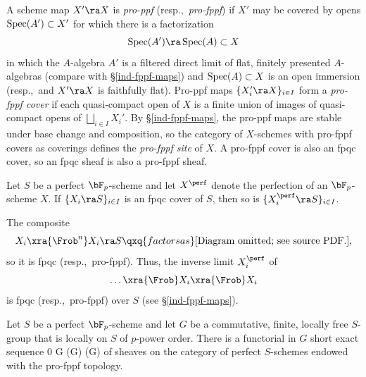 

 \label{X-profppf}
A scheme map $X' \ra X$ is \emph{pro-ppf} (resp.,~\emph{pro-fppf}) if $X'$ may be covered by opens $\operatorname{Spec}(A') \subset X'$ for which there is a factorization
\[
\Spec(A') \ra \Spec(A) \subset X
\]
in which the $A$-algebra $A'$ is a filtered direct limit of flat, finitely presented $A$-algebras (compare with \S\ref{ind-fppf-maps}) and $\operatorname{Spec}(A) \subset X$ is an open immersion (resp.,~and $X' \ra X$ is faithfully flat). Pro-ppf maps
$\{X_i' \ra X\}_{i \in I}$
form a \emph{pro-fppf cover} if each quasi-compact open of $X$ is a finite union of images of quasi-compact opens of $\bigsqcup_{i \in I} X_i'$.  By \S\ref{ind-fppf-maps}, the pro-ppf maps are stable under base change and composition, so the category of $X$-schemes with pro-fppf covers as coverings defines the \emph{pro-fppf site} of $X$. A pro-fppf cover is also an fpqc cover, so an fpqc sheaf is also a pro-fppf sheaf.
\epp



\blem \label{lem:perf-still-pro-fppf}
Let $S$ be a perfect $\bF_p$-scheme and let $X^\perf$ denote the perfection of an $\bF_p$-scheme $X$. If $\{X_i \ra S\}_{i \in I}$ is an fpqc  cover of $S$, then so is $\{X_i^\perf \ra S\}_{i \in I}$.
\elem

\bpf
The composite
\[
X_i \xra{\Frob^n} X_i \ra S \qxq{factors as} \text{[Diagram omitted; see source PDF.]},
\]
so it is fpqc (resp.,~pro-fppf). Thus, the inverse limit $X_i^\perf$ of
\[
\dotsc \xra{\Frob} X_i \xra{\Frob} X_i
\]
is fpqc (resp.,~pro-fppf) over $S$ (see \S\ref{ind-fppf-maps}).
\epf





\bprop \label{thm:KTG-input}
Let $S$ be a perfect $\bF_p$-scheme and let $G$ be a commutative, finite, locally free $S$-group that is locally on $S$ of $p$-power order. There is a functorial in $G$ short exact sequence
\be \label{eqn:KTG-input-SES}
0 \ra G \xra{\ref{lem:syntomic-low-coh-id}} \bM(G)  \bM(G) 
\ee
of sheaves on the category of perfect $S$-schemes endowed with the pro-fppf topology. %
\eprop

